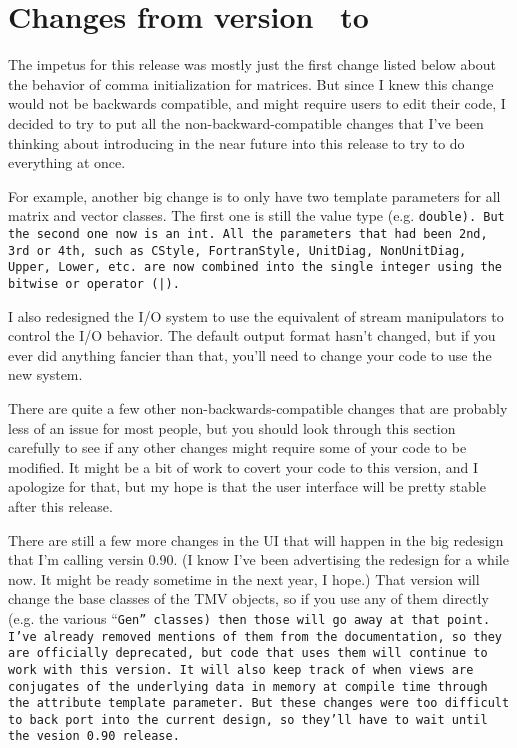 
\section{Changes from version \prevtmvversion\ to \tmvversion}
\label{Changes}

The impetus for this release was mostly just the first change listed below
about the behavior of comma initialization for matrices.  But since I knew
this change would not be backwards compatible, and might require users
to edit their code, I decided to try to put all the non-backward-compatible changes that I've been thinking about introducing in the near future into this
release to try to do everything at once. 

For example, another big change is to only have two template parameters for all matrix and vector
classes.  The first one is
still the value type (e.g. \tt{double}).  But the second one now is an \tt{int}.
All the parameters that had been 2nd, 3rd or 4th, such as \tt{CStyle}, \tt{FortranStyle}, 
\tt{UnitDiag}, \tt{NonUnitDiag}, \tt{Upper}, \tt{Lower}, etc. are now combined into the single
integer using the bitwise or operator (\tt{|}).  

I also redesigned the I/O system to use the equivalent of stream manipulators 
to control the I/O behavior.  The default output format hasn't changed, but 
if you ever did anything fancier than that, you'll need to change your code 
to use the new system.

There are quite a few other non-backwards-compatible changes that are 
probably less of an issue for most people, but you should look through 
this section carefully to see if any other changes might require some
of your code to be modified.  It might be a bit of work to covert your 
code to this version, and I apologize for that, but my hope is that the 
user interface will be pretty stable after this release.

There are still a few more changes in the UI that will happen in the 
big redesign that I'm calling versin 0.90.
(I know I've been advertising the redesign for a while now.
It might be ready sometime in the next year, I hope.)
That version will change the base classes of the TMV objects, so if
you use any of them directly (e.g. the various ``\tt{Gen}'' classes)  
then those will go away at that point.  I've already removed mentions of
them from the documentation, so they are officially deprecated, but 
code that uses them will continue to work with this version.  It will
also keep track of when views are conjugates of the underlying data in
memory at compile time through the attribute template parameter.  But
these changes were too difficult to back port into the current design, so
they'll have to wait until the vesion 0.90 release.

